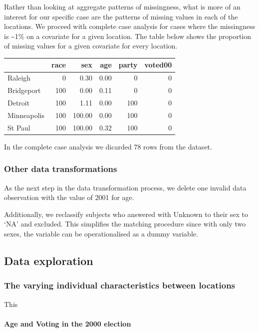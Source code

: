 \documentclass[]{article}
\let\oldparagraph\paragraph
\renewcommand{\paragraph}[1]{\oldparagraph{#1}\mbox{}}
\begin{document}
Rather than looking at aggregate patterns of missingness, what is more
of an interest for our specific case are the patterns of missing values
in each of the locations. We proceed with complete case analysis for
cases where the missingness is \textasciitilde{}1\% on a covariate for a
given location. The table below shows the proportion of missing values
for a given covariate for every location.

\begin{longtable}[]{@{}lrrrrr@{}}
\toprule
& race & sex & age & party & voted00\tabularnewline
\midrule
\endhead
Raleigh & 0 & 0.30 & 0.00 & 0 & 0\tabularnewline
Bridgeport & 100 & 0.00 & 0.11 & 0 & 0\tabularnewline
Detroit & 100 & 1.11 & 0.00 & 100 & 0\tabularnewline
Minneapolis & 100 & 100.00 & 0.00 & 100 & 0\tabularnewline
St Paul & 100 & 100.00 & 0.32 & 100 & 0\tabularnewline
\bottomrule
\end{longtable}

In the complete case analysis we dicarded 78 rows from the dataset.

\subsubsection{Other data
transformations}\label{other-data-transformations}

As the next step in the data transformation process, we delete one
invalid data observation with the value of 2001 for age.

Additionally, we reclassify subjects who answered with Unknown to their
sex to `NA' and excluded. This simplifies the matching procedure since
with only two sexes, the variable can be operationalised as a dummy
variable.

\subsection{Data exploration}\label{data-exploration}

\subsubsection{The varying individual characteristics between
locations}\label{the-varying-individual-characteristics-between-locations}

This

\paragraph{Age and Voting in the 2000
election}\label{age-and-voting-in-the-2000-election}
\end{document}
